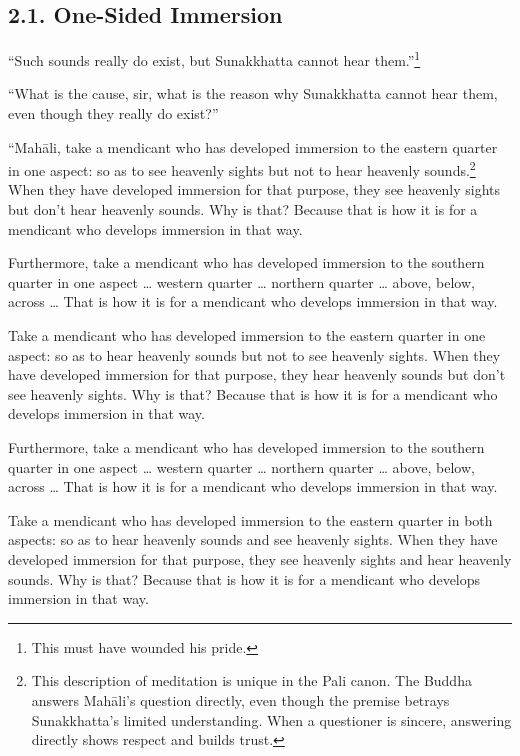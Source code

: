 \documentclass[12pt,openany]{book}%
\begin{document}
\subsection*{2.1. One-Sided Immersion }

“Such sounds really do exist, but Sunakkhatta cannot hear them.”\footnote{This must have wounded his pride. } 

“What is the cause, sir, what is the reason why Sunakkhatta cannot hear them, even though they really do exist?” 

“\textsanskrit{Mahāli}, take a mendicant who has developed immersion to the eastern quarter in one aspect: so as to see heavenly sights but not to hear heavenly sounds.\footnote{This description of meditation is unique in the Pali canon. The Buddha answers \textsanskrit{Mahāli}’s question directly, even though the premise betrays Sunakkhatta’s limited understanding. When a questioner is sincere, answering directly shows respect and builds trust. } When they have developed immersion for that purpose, they see heavenly sights but don’t hear heavenly sounds. Why is that? Because that is how it is for a mendicant who develops immersion in that way. 

Furthermore, take a mendicant who has developed immersion to the southern quarter in one aspect … western quarter … northern quarter … above, below, across … That is how it is for a mendicant who develops immersion in that way. 

Take a mendicant who has developed immersion to the eastern quarter in one aspect: so as to hear heavenly sounds but not to see heavenly sights. When they have developed immersion for that purpose, they hear heavenly sounds but don’t see heavenly sights. Why is that? Because that is how it is for a mendicant who develops immersion in that way. 

Furthermore, take a mendicant who has developed immersion to the southern quarter in one aspect … western quarter … northern quarter … above, below, across … That is how it is for a mendicant who develops immersion in that way. 

Take a mendicant who has developed immersion to the eastern quarter in both aspects: so as to hear heavenly sounds and see heavenly sights. When they have developed immersion for that purpose, they see heavenly sights and hear heavenly sounds. Why is that? Because that is how it is for a mendicant who develops immersion in that way. 
\end{document}
